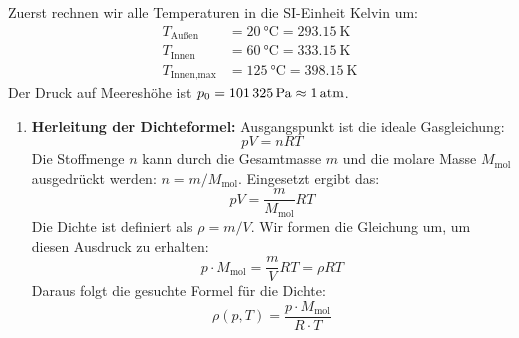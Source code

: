 \documentclass[ngerman]{scrreprt}
\newenvironment{loesungbox}[1]
  {\needspace{5\baselineskip}\begin{loesungboxstyle}[frametitle={#1}]}
  {\end{loesungboxstyle}}
\begin{document}
\begin{loesungbox}{Lösung zu \Cref{aufg:ballonfahrt}}
Zuerst rechnen wir alle Temperaturen in die SI-Einheit Kelvin um:
\begin{align*}
    T_{\text{Außen}} &= \SI{20}{\celsius} = \SI{293.15}{\kelvin} \\
    T_{\text{Innen}} &= \SI{60}{\celsius} = \SI{333.15}{\kelvin} \\
    T_{\text{Innen,max}} &= \SI{125}{\celsius} = \SI{398.15}{\kelvin}
\end{align*}
Der Druck auf Meereshöhe ist $p_0 = \SI{101325}{\pascal} \approx \SI{1}{\mathrm{atm}}$.

\begin{enumerate}
    \item \textbf{Herleitung der Dichteformel:}
    Ausgangspunkt ist die ideale Gasgleichung:
    \begin{equation}
        p V = n R T
    \end{equation}
    Die Stoffmenge $n$ kann durch die Gesamtmasse $m$ und die molare Masse $M_{\text{mol}}$ ausgedrückt werden: $n = m/M_{\text{mol}}$. Eingesetzt ergibt das:
    \begin{equation}
        p V = \frac{m}{M_{\text{mol}}} R T
    \end{equation}
    Die Dichte ist definiert als $\rho = m/V$. Wir formen die Gleichung um, um diesen Ausdruck zu erhalten:
    \begin{equation}
        p \cdot M_{\text{mol}} = \frac{m}{V} R T = \rho R T
    \end{equation}
    Daraus folgt die gesuchte Formel für die Dichte:
    \begin{equation} \label{eq: dichte_gas_1}
        \rho(p, T) = \frac{p \cdot M_{\text{mol}}}{R \cdot T}
    \end{equation}


\end{enumerate}
\end{loesungbox}
\end{document}
